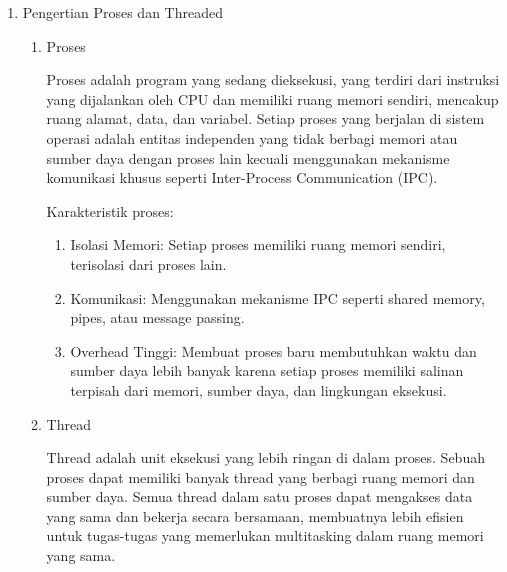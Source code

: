 \documentclass[12pt]{article}
\begin{document}
\begin{enumerate}
	\item Pengertian Proses dan Threaded
	      \begin{enumerate}
		      \item Proses

		            Proses adalah program yang sedang dieksekusi, yang terdiri dari instruksi yang dijalankan oleh CPU dan memiliki ruang memori sendiri, mencakup ruang alamat, data, dan variabel. Setiap proses yang berjalan di sistem operasi adalah entitas independen yang tidak berbagi memori atau sumber daya dengan proses lain kecuali menggunakan mekanisme komunikasi khusus seperti Inter-Process Communication (IPC).

		            Karakteristik proses:
		            \begin{enumerate}
			            \item Isolasi Memori: Setiap proses memiliki ruang memori sendiri, terisolasi dari proses lain.
			            \item Komunikasi: Menggunakan mekanisme IPC seperti shared memory, pipes, atau message passing.
			            \item Overhead Tinggi: Membuat proses baru membutuhkan waktu dan sumber daya lebih banyak karena setiap proses memiliki salinan terpisah dari memori, sumber daya, dan lingkungan eksekusi.
		            \end{enumerate}
		      \item Thread

		            Thread adalah unit eksekusi yang lebih ringan di dalam proses. Sebuah proses dapat memiliki banyak thread yang berbagi ruang memori dan sumber daya. Semua thread dalam satu proses dapat mengakses data yang sama dan bekerja secara bersamaan, membuatnya lebih efisien untuk tugas-tugas yang memerlukan multitasking dalam ruang memori yang sama.


\end{enumerate}
\end{enumerate}
\end{document}
